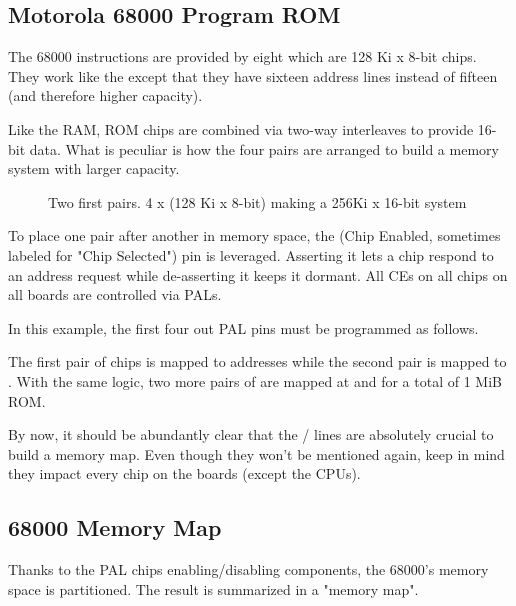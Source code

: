 \subsection{Motorola 68000 Program ROM}


The 68000 instructions are provided by eight  which are 128 Ki x 8-bit chips. They work like the  except that they have sixteen address lines instead of fifteen (and therefore higher capacity).

Like the RAM, ROM chips are combined via two-way interleaves to provide 16-bit data. What is peculiar is how the four pairs are arranged to build a memory system with larger capacity.


\begin{figure}[H]
\caption*{Two first pairs. 4 x (128 Ki x 8-bit) making a 256Ki x 16-bit system}
\end{figure}

To place one pair after another in memory space, the  (Chip Enabled, sometimes labeled  for "Chip Selected") pin is leveraged. Asserting it lets a chip respond to an address request while de-asserting it keeps it dormant. All CEs on all chips on all boards are controlled via PALs.

In this example, the first four out PAL pins must be programmed as follows.




The first pair of chips is mapped to addresses  while the second pair is mapped to . With the same logic, two more pairs of  are mapped at  and  for a total of 1 MiB ROM.



By now, it should be abundantly clear that the  /  lines are absolutely crucial to build a memory map. Even though they won't be mentioned again, keep in mind they impact every chip on the boards (except the CPUs).

\subsection{68000 Memory Map}

Thanks to the PAL chips enabling/disabling components, the 68000's memory space is partitioned. The result is summarized in a "memory map".

